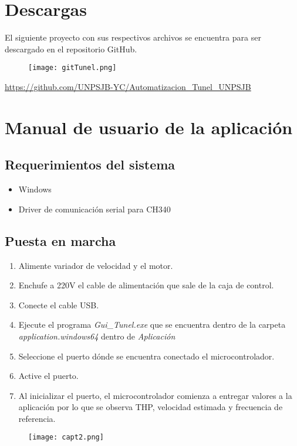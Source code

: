 \section{Descargas}
El siguiente proyecto con sus respectivos archivos se encuentra para ser descargado en el repositorio GitHub.
\begin{figure}[htb]
	\centering
	\texttt{[image: gitTunel.png]}
	\label{fig:git}
\end{figure}

\url{https://github.com/UNPSJB-YC/Automatizacion_Tunel_UNPSJB}
\newpage
\section{Manual de usuario de la aplicación}
\subsection{Requerimientos del sistema}
\begin{itemize}
	\item Windows
	\item Driver de comunicación serial para CH340 
\end{itemize}


\subsection{Puesta en marcha}
\begin{enumerate}
	\item Alimente variador de velocidad y el motor.
	\item Enchufe a 220V el cable de alimentación que sale de la caja de control.
	\item Conecte el cable USB.
	\item Ejecute el programa \textit{Gui\_Tunel.exe} que se encuentra dentro de la carpeta \textit{application.windows64} dentro de \textit{Aplicación}
	\item Seleccione el puerto dónde se encuentra conectado el microcontrolador.
	\item Active el puerto.
	\item Al inicializar el puerto, el microcontrolador comienza a entregar valores a la aplicación por lo que se observa THP, velocidad estimada y frecuencia de referencia. 
	
\end{enumerate}

\begin{figure}[H]
	\centering
	\texttt{[image: capt2.png]}
	\label{fig:capt2}
\end{figure}



